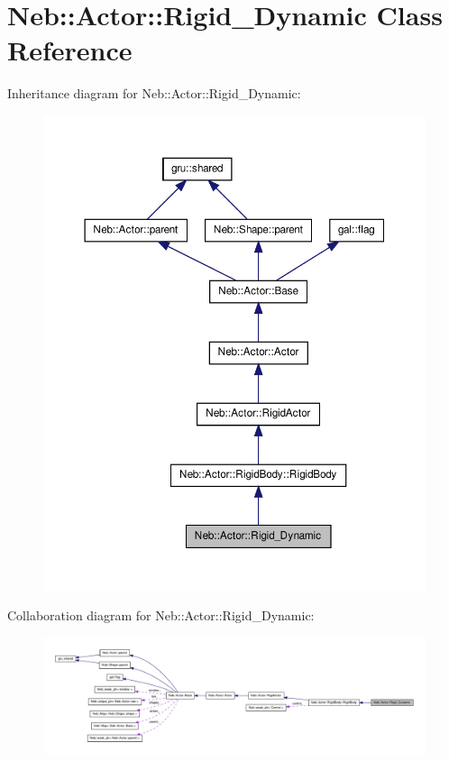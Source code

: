 \hypertarget{classNeb_1_1Actor_1_1Rigid__Dynamic}{\section{\-Neb\-:\-:\-Actor\-:\-:\-Rigid\-\_\-\-Dynamic \-Class \-Reference}
\label{classNeb_1_1Actor_1_1Rigid__Dynamic}
}


\-Inheritance diagram for \-Neb\-:\-:\-Actor\-:\-:\-Rigid\-\_\-\-Dynamic\-:\nopagebreak
\begin{figure}[H]
\begin{center}
\leavevmode
\includegraphics[width=350pt]{classNeb_1_1Actor_1_1Rigid__Dynamic__inherit__graph}
\end{center}
\end{figure}


\-Collaboration diagram for \-Neb\-:\-:\-Actor\-:\-:\-Rigid\-\_\-\-Dynamic\-:\nopagebreak
\begin{figure}[H]
\begin{center}
\leavevmode
\includegraphics[width=350pt]{classNeb_1_1Actor_1_1Rigid__Dynamic__coll__graph}
\end{center}
\end{figure}
